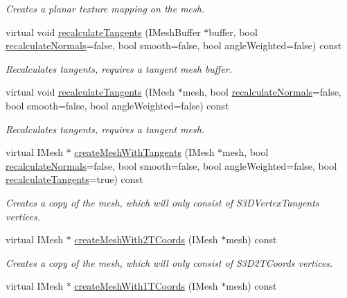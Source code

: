 \begin{DoxyCompactItemize}
\begin{DoxyCompactList}\small\item\em Creates a planar texture mapping on the mesh. \end{DoxyCompactList}\item 
virtual void \hyperlink{classirr_1_1scene_1_1_c_mesh_manipulator_a55d73303cc42b667c2383173b3f63fc5}{recalculate\-Tangents} (I\-Mesh\-Buffer $\ast$buffer, bool \hyperlink{classirr_1_1scene_1_1_c_mesh_manipulator_a7ac014c657a2cff78ba107569097b151}{recalculate\-Normals}=false, bool smooth=false, bool angle\-Weighted=false) const 
\begin{DoxyCompactList}\small\item\em Recalculates tangents, requires a tangent mesh buffer. \end{DoxyCompactList}\item 
virtual void \hyperlink{classirr_1_1scene_1_1_c_mesh_manipulator_aa48c6b32d658fc8264921e1da2ed1aa5}{recalculate\-Tangents} (I\-Mesh $\ast$mesh, bool \hyperlink{classirr_1_1scene_1_1_c_mesh_manipulator_a7ac014c657a2cff78ba107569097b151}{recalculate\-Normals}=false, bool smooth=false, bool angle\-Weighted=false) const 
\begin{DoxyCompactList}\small\item\em Recalculates tangents, requires a tangent mesh. \end{DoxyCompactList}\item 
\hypertarget{classirr_1_1scene_1_1_c_mesh_manipulator_a1156243875d47feb81734471e2c64698}{virtual I\-Mesh $\ast$ \hyperlink{classirr_1_1scene_1_1_c_mesh_manipulator_a1156243875d47feb81734471e2c64698}{create\-Mesh\-With\-Tangents} (I\-Mesh $\ast$mesh, bool \hyperlink{classirr_1_1scene_1_1_c_mesh_manipulator_a7ac014c657a2cff78ba107569097b151}{recalculate\-Normals}=false, bool smooth=false, bool angle\-Weighted=false, bool \hyperlink{classirr_1_1scene_1_1_c_mesh_manipulator_a55d73303cc42b667c2383173b3f63fc5}{recalculate\-Tangents}=true) const }\label{classirr_1_1scene_1_1_c_mesh_manipulator_a1156243875d47feb81734471e2c64698}

\begin{DoxyCompactList}\small\item\em Creates a copy of the mesh, which will only consist of S3\-D\-Vertex\-Tangents vertices. \end{DoxyCompactList}\item 
virtual I\-Mesh $\ast$ \hyperlink{classirr_1_1scene_1_1_c_mesh_manipulator_ad0bd912b83c02b7183db031cac542483}{create\-Mesh\-With2\-T\-Coords} (I\-Mesh $\ast$mesh) const 
\begin{DoxyCompactList}\small\item\em Creates a copy of the mesh, which will only consist of S3\-D2\-T\-Coords vertices. \end{DoxyCompactList}\item 
\hypertarget{classirr_1_1scene_1_1_c_mesh_manipulator_a248015a67f04a849482fcff221f09743}{virtual I\-Mesh $\ast$ \hyperlink{classirr_1_1scene_1_1_c_mesh_manipulator_a248015a67f04a849482fcff221f09743}{create\-Mesh\-With1\-T\-Coords} (I\-Mesh $\ast$mesh) const }\label{classirr_1_1scene_1_1_c_mesh_manipulator_a248015a67f04a849482fcff221f09743}


\end{DoxyCompactItemize}
